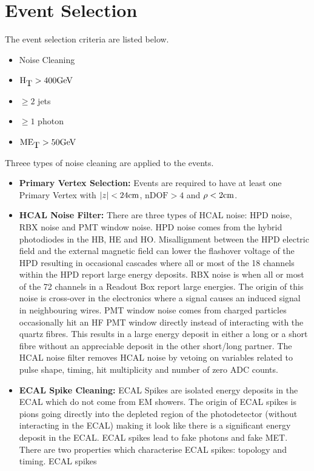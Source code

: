 \section{Event Selection}

The event selection criteria are listed below. 

\begin{itemize}
\item Noise Cleaning
\item $\mbox{H}_{\mbox{T}} > 400 \mbox{GeV}$
\item $\geq 2$ jets
\item $\geq 1$ photon
\item $\mbox{ME}_{\mbox{T}} > 50 \mbox{GeV}$
\end{itemize}

Threee types of noise cleaning are applied to the events. 
\begin{itemize}
\item {\bf Primary Vertex Selection:} Events are required to have at least one
Primary Vertex with $|z| < 24\mbox{cm}$, $\mbox{nDOF} > 4$ and $\rho < 2\mbox{cm}$.
\item {\bf HCAL Noise Filter:} There are three types of HCAL noise: HPD noise, 
RBX noise and PMT window noise. HPD noise comes from the hybrid photodiodes in
the HB, HE and HO. Misallignment between the HPD electric field and the external
magnetic field can lower the flashover voltage of the HPD resulting in 
occasional cascades where all or most of the 18 channels within the HPD report
large energy deposits. RBX noise is when all or most of the 72 channels in a
Readout Box report large energies. The origin of this noise is cross-over in the
electronics where a signal causes an induced signal in neighbouring wires.
PMT window noise comes from charged particles occasionally hit an HF PMT window 
directly instead of interacting with the quartz fibres. This results in a large 
energy deposit in either a long or a short fibre without an appreciable deposit 
in the other short/long partner. The HCAL noise filter removes HCAL noise by 
vetoing on variables related to pulse shape, timing, hit multiplicity and number
of zero ADC counts.
\item {\bf ECAL Spike Cleaning:} ECAL Spikes are isolated energy deposits in 
the ECAL which do not come from EM showers. The origin of ECAL spikes is pions
going directly into the depleted region of the photodetector (without
interacting in the ECAL) making it look like there is a significant energy 
deposit in the ECAL. ECAL spikes lead to fake photons and fake MET. There are 
two properties which characterise ECAL spikes: topology and timing. ECAL spikes 

\end{itemize}
